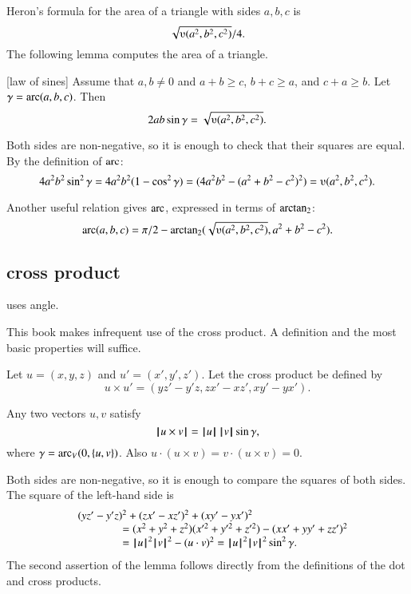 Heron's formula for the area of 
a triangle with sides $a,b,c$ is $$\sqrt{\ups(a^2,b^2,c^2)}/4.$$  
%
The following
lemma  computes the area of a triangle.  

\begin{lemma}[law of sines]
Assume that $a,b\ne 0$ and $a+b\ge c$, $b+c\ge a$, and $c+a\ge b$.
Let $\gamma=\operatorname{arc}(a,b,c)$.  Then
        $$2 a b \sin\gamma = \sqrt{\ups(a^2,b^2,c^2)}.$$
\end{lemma}
%
%
%
\begin{proved}
Both sides are non-negative, so it is enough to check
that their squares are equal.  By the definition of $\operatorname{arc}$:
      $$4 a^2 b^2 \sin^2\gamma = 4 a^2 b^2 (1-\cos^2\gamma) = (4 a^2 b^2 - (a^2 + b^2 -
      c^2)^2) = \ups(a^2,b^2,c^2).$$
\swallowed\end{proved}

Another useful relation gives $\operatorname{arc}$, expressed in terms of ${\operatorname{arctan_2}}$:
  $$
  \arc(a,b,c) = 
    \pi/2 - \atn({\sqrt{\ups(a^2,b^2,c^2)}},{ a^2 + b^2 - c^2}).
    $$



\subsection{cross product} uses angle.

This book makes infrequent use of the cross product.
A definition and the most basic properties will suffice.

\begin{definition}   Let $u =(x,y,z)$ and $u' = (x',y',z')$.  
Let the cross product be defined
by
    $$
    u \times u' = (y z' - y' z, z x' - x z', x y' - y x').
    $$
%
%
%
\end{definition}

\begin{lemma}  
Any two vectors $u,v$ satisfy
    $${{\hskip0.1em|\hskip-0.15em|\hskip0.1em}u \times v{\hskip0.1em|\hskip-0.15em|\hskip0.1em}} = {{\hskip0.1em|\hskip-0.15em|\hskip0.1em}u{\hskip0.1em|\hskip-0.15em|\hskip0.1em}}\,{{\hskip0.1em|\hskip-0.15em|\hskip0.1em}v{\hskip0.1em|\hskip-0.15em|\hskip0.1em}}\sin\gamma,$$
where $\gamma=\operatorname{arc}_V(0,\{u,v\})$.
Also $u \cdot (u\times v) = v\cdot (u\times v) = 0$.
\end{lemma}

\begin{proved}
   Both sides are non-negative, so it is enough to compare the
   squares of both sides.  The square of the left-hand side is
   $$
   \begin{array}{lll}
   &(y z'- y'z)^2 + (z x' - x z')^2 + (x y' - y x')^2 \\
    &\qquad\qquad=
   (x^2 + y^2 + z^2)(x'^2 + y'^2 + z'^2) - (x x' + y y' + z z')^2
   \\&\qquad\qquad= {{\hskip0.1em|\hskip-0.15em|\hskip0.1em}u{\hskip0.1em|\hskip-0.15em|\hskip0.1em}}^2{{\hskip0.1em|\hskip-0.15em|\hskip0.1em}v{\hskip0.1em|\hskip-0.15em|\hskip0.1em}}^2 - (u\cdot v)^2 = {{\hskip0.1em|\hskip-0.15em|\hskip0.1em}u{\hskip0.1em|\hskip-0.15em|\hskip0.1em}}^2{{\hskip0.1em|\hskip-0.15em|\hskip0.1em}v{\hskip0.1em|\hskip-0.15em|\hskip0.1em}}^2 \sin^2\gamma.
   \end{array}
   $$
The second assertion of the lemma follows directly from the definitions of the dot and cross products.
\swallowed\end{proved}


